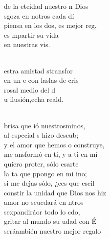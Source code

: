 \documentclass[12pt]{article}
\begin{document}
\begin{multicols*}{2}
\begin{cancion}%
	de la eteidad nuestro n Dios\\
	sgoza en notros cada dí\\
	piensa en los dos, es  mejor reg,\\
	es mpartir su vida \\
	en nuestras vis.\\\jump\\
	\begin{chorus}%
	estra amistad stransfor \\
	en un e con laslas de cris \\
	 rosal  medio del d \\
	u ilusión,echa reald.\\
	\end{chorus}%
	\jump\\
	brisa que ió nuestrosminos,\\
	al especial s hizo descub;\\
	y el amor que hemos o construye,\\
	me ansformó en ti, y a ti en mí\\
\jump
	quiero proter, sólo esarte\\
	la ta que ppongo en mi ino;\\
	si me dejas sólo, ¿ees que escil \\
	constir la unidad que Dios nos hiz\\
\jump
	amor no seuedará en ntros\\
	sexpandiráor todo lo cdo,\\
	gritar al mundo su udad con É\\
	seráambién nuestro mejor regalo\\
\end{cancion}%


\end{multicols*}
\end{document}
